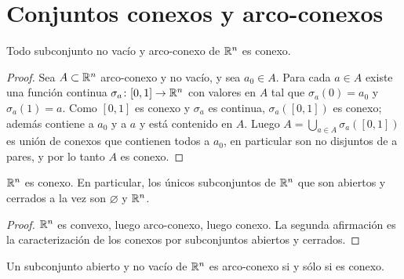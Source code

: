 \section{Conjuntos conexos y arco-conexos}

\begin{theorem}
  Todo subconjunto no vacío y arco-conexo de \(\mathbb{R}^n\) es conexo.
\end{theorem}

\begin{proof}
  Sea \(A \subset \mathbb{R}^n\) arco-conexo y no vacío, y sea \(a_0 \in A\). Para cada \(a \in A\) existe una función continua \(\sigma_a\colon [0, 1] \to \mathbb{R}^n\) con valores en \(A\) tal que \(\sigma_a(0) = a_0\) y \(\sigma_a(1) = a\). Como \([0, 1]\) es conexo y \(\sigma_a\) es continua, \(\sigma_a([0, 1])\) es conexo; además contiene a \(a_0\) y a \(a\) y está contenido en \(A\). Luego \(A = \bigcup_{a \in A} \sigma_a([0, 1])\) es unión de conexos que contienen todos a \(a_0\), en particular son no disjuntos de a pares, y por lo tanto \(A\) es conexo.
\end{proof}

\begin{corollary}
  \(\mathbb{R}^n\) es conexo. En particular, los únicos subconjuntos de \(\mathbb{R}^n\) que son abiertos y cerrados a la vez son \(\varnothing\) y \(\mathbb{R}^n\).
\end{corollary}

\begin{proof}
  \(\mathbb{R}^n\) es convexo, luego arco-conexo, luego conexo. La segunda afirmación es la caracterización de los conexos por subconjuntos abiertos y cerrados.
\end{proof}

\begin{theorem}
  Un subconjunto abierto y no vacío de \(\mathbb{R}^n\) es arco-conexo si y sólo si es conexo.
\end{theorem}

